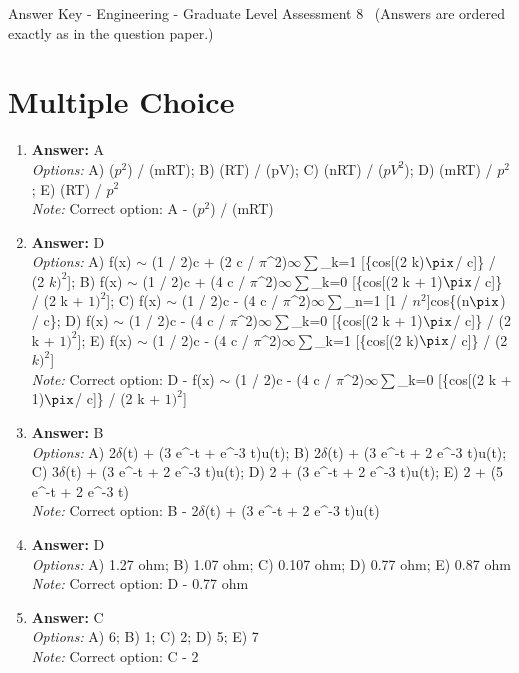 \documentclass[12pt]{article}
\begin{document}
\begin{center}
Answer Key - Engineering - Graduate Level Assessment 8 \
\small (Answers are ordered exactly as in the question paper.)
\end{center}

\section*{Multiple Choice}
\begin{enumerate}[label=\arabic*.]
\item \textbf{Answer:} A
\\ \textit{Options:} A) ($p^2$) / (mRT); B) (RT) / (pV); C) (nRT) / ($pV^2$); D) (mRT) / $p^2$; E) (RT) / $p^2$
\\ \textit{Note:} Correct option: A - ($p^2$) / (mRT)
\item \textbf{Answer:} D
\\ \textit{Options:} A) f(x) \ensuremath{\sim} (1 / 2)c + (2 c / \ensuremath{\pi}^2)\ensuremath{\infty}\ensuremath{\sum}\_k=1 [\{cos[(2 k)\ensuremath{\pix}/ c]\} / (2 $k)^2$]; B) f(x) \ensuremath{\sim} (1 / 2)c + (4 c / \ensuremath{\pi}^2)\ensuremath{\infty}\ensuremath{\sum}\_k=0 [\{cos[(2 k + 1)\ensuremath{\pix}/ c]\} / (2 k + $1)^2$]; C) f(x) \ensuremath{\sim} (1 / 2)c - (4 c / \ensuremath{\pi}^2)\ensuremath{\infty}\ensuremath{\sum}\_n=1 [1 / $n^2$]cos\{(n\ensuremath{\pix}) / c\}; D) f(x) \ensuremath{\sim} (1 / 2)c - (4 c / \ensuremath{\pi}^2)\ensuremath{\infty}\ensuremath{\sum}\_k=0 [\{cos[(2 k + 1)\ensuremath{\pix}/ c]\} / (2 k + $1)^2$]; E) f(x) \ensuremath{\sim} (1 / 2)c - (4 c / \ensuremath{\pi}^2)\ensuremath{\infty}\ensuremath{\sum}\_k=1 [\{cos[(2 k)\ensuremath{\pix}/ c]\} / (2 $k)^2$]
\\ \textit{Note:} Correct option: D - f(x) \ensuremath{\sim} (1 / 2)c - (4 c / \ensuremath{\pi}^2)\ensuremath{\infty}\ensuremath{\sum}\_k=0 [\{cos[(2 k + 1)\ensuremath{\pix}/ c]\} / (2 k + $1)^2$]
\item \textbf{Answer:} B
\\ \textit{Options:} A) 2\ensuremath{\delta}(t) + (3 e^-t + e^-3 t)u(t); B) 2\ensuremath{\delta}(t) + (3 e^-t + 2 e^-3 t)u(t); C) 3\ensuremath{\delta}(t) + (3 e^-t + 2 e^-3 t)u(t); D) 2 + (3 e^-t + 2 e^-3 t)u(t); E) 2 + (5 e^-t + 2 e^-3 t)
\\ \textit{Note:} Correct option: B - 2\ensuremath{\delta}(t) + (3 e^-t + 2 e^-3 t)u(t)
\item \textbf{Answer:} D
\\ \textit{Options:} A) 1.27 ohm; B) 1.07 ohm; C) 0.107 ohm; D) 0.77 ohm; E) 0.87 ohm
\\ \textit{Note:} Correct option: D - 0.77 ohm
\item \textbf{Answer:} C
\\ \textit{Options:} A) 6; B) 1; C) 2; D) 5; E) 7
\\ \textit{Note:} Correct option: C - 2
\end{enumerate}
\end{document}
